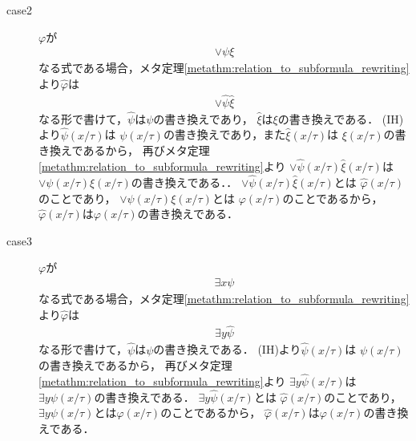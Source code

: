 \begin{metaprf}[第一]
\begin{description}
\begin{description}
					\item[case2] $\varphi$が
						\begin{align}
							\vee \psi \xi
						\end{align}
						なる式である場合，メタ定理\ref{metathm:relation_to_subformula_rewriting}より$\widehat{\varphi}$は
						\begin{align}
							\vee \widehat{\psi} \widehat{\xi}
						\end{align}
						なる形で書けて，$\widehat{\psi}$は$\psi$の書き換えであり，
						$\widehat{\xi}$は$\xi$の書き換えである．
						(IH)より$\widehat{\psi}(x/\tau)$は
						$\psi(x/\tau)$の書き換えであり，また$\widehat{\xi}(x/\tau)$は
						$\xi(x/\tau)$の書き換えであるから，
						再びメタ定理\ref{metathm:relation_to_subformula_rewriting}より
						$\vee \widehat{\psi}(x/\tau)\widehat{\xi}(x/\tau)$は
						$\vee \psi(x/\tau)\xi(x/\tau)$の書き換えである．．
						$\vee \widehat{\psi}(x/\tau)\widehat{\xi}(x/\tau)$とは
						$\widehat{\varphi}(x/\tau)$のことであり，
						$\vee \psi(x/\tau)\xi(x/\tau)$とは
						$\varphi(x/\tau)$のことであるから，
						$\widehat{\varphi}(x/\tau)$は$\varphi(x/\tau)$の書き換えである．
					
					\item[case3] $\varphi$が
						\begin{align}
							\exists x \psi
						\end{align}
						なる式である場合，メタ定理\ref{metathm:relation_to_subformula_rewriting}より$\widehat{\varphi}$は
						\begin{align}
							\exists y \widehat{\psi}
						\end{align}
						なる形で書けて，$\widehat{\psi}$は$\psi$の書き換えである．
						(IH)より$\widehat{\psi}(x/\tau)$は
						$\psi(x/\tau)$の書き換えであるから，
						再びメタ定理\ref{metathm:relation_to_subformula_rewriting}より
						$\exists y \widehat{\psi}(x/\tau)$は
						$\exists y \psi(x/\tau)$の書き換えである．
						$\exists y \widehat{\psi}(x/\tau)$とは
						$\widehat{\varphi}(x/\tau)$のことであり，
						$\exists y \psi(x/\tau)$とは$\varphi(x/\tau)$のことであるから，
						$\widehat{\varphi}(x/\tau)$は$\varphi(x/\tau)$の書き換えである．
						\QED
				\end{description}
		\end{description}
	\end{metaprf}